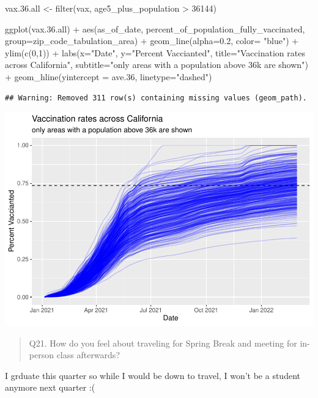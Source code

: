 \documentclass[
]{article}
\newenvironment{Shaded}{\begin{snugshade}}{\end{snugshade}}
\newcommand{\AttributeTok}[1]{\textcolor[rgb]{0.77,0.63,0.00}{#1}}
\newcommand{\DecValTok}[1]{\textcolor[rgb]{0.00,0.00,0.81}{#1}}
\newcommand{\FloatTok}[1]{\textcolor[rgb]{0.00,0.00,0.81}{#1}}
\newcommand{\FunctionTok}[1]{\textcolor[rgb]{0.00,0.00,0.00}{#1}}
\newcommand{\NormalTok}[1]{#1}
\newcommand{\OtherTok}[1]{\textcolor[rgb]{0.56,0.35,0.01}{#1}}
\newcommand{\SpecialCharTok}[1]{\textcolor[rgb]{0.00,0.00,0.00}{#1}}
\newcommand{\StringTok}[1]{\textcolor[rgb]{0.31,0.60,0.02}{#1}}
\begin{document}
\begin{Shaded}
\begin{Highlighting}[]
\NormalTok{vax.}\FloatTok{36.}\NormalTok{all }\OtherTok{\textless{}{-}} \FunctionTok{filter}\NormalTok{(vax, age5\_plus\_population }\SpecialCharTok{\textgreater{}} \DecValTok{36144}\NormalTok{)}

\FunctionTok{ggplot}\NormalTok{(vax.}\FloatTok{36.}\NormalTok{all) }\SpecialCharTok{+}
  \FunctionTok{aes}\NormalTok{(as\_of\_date,}
\NormalTok{      percent\_of\_population\_fully\_vaccinated, }
      \AttributeTok{group=}\NormalTok{zip\_code\_tabulation\_area) }\SpecialCharTok{+}
  \FunctionTok{geom\_line}\NormalTok{(}\AttributeTok{alpha=}\FloatTok{0.2}\NormalTok{, }\AttributeTok{color=} \StringTok{"blue"}\NormalTok{) }\SpecialCharTok{+}
  \FunctionTok{ylim}\NormalTok{(}\FunctionTok{c}\NormalTok{(}\DecValTok{0}\NormalTok{,}\DecValTok{1}\NormalTok{)) }\SpecialCharTok{+}
  \FunctionTok{labs}\NormalTok{(}\AttributeTok{x=}\StringTok{"Date"}\NormalTok{, }\AttributeTok{y=}\StringTok{"Percent Vaccianted"}\NormalTok{,}
       \AttributeTok{title=}\StringTok{"Vaccination rates across California"}\NormalTok{,}
       \AttributeTok{subtitle=}\StringTok{"only areas with a population above 36k are shown"}\NormalTok{) }\SpecialCharTok{+}
  \FunctionTok{geom\_hline}\NormalTok{(}\AttributeTok{yintercept =}\NormalTok{ ave}\FloatTok{.36}\NormalTok{, }\AttributeTok{linetype=}\StringTok{"dashed"}\NormalTok{)}
\end{Highlighting}
\end{Shaded}

\begin{verbatim}
## Warning: Removed 311 row(s) containing missing values (geom_path).
\end{verbatim}

\includegraphics{COVID-19-Vax-mini-project_files/figure-latex/unnamed-chunk-37-1.pdf}

\begin{quote}
Q21. How do you feel about traveling for Spring Break and meeting for
in-person class afterwards?
\end{quote}

I grduate this quarter so while I would be down to travel, I won't be a
student anymore next quarter :(
\end{document}
